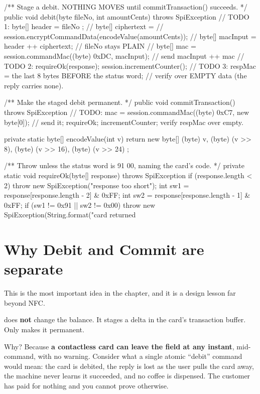 \begin{jcode}
    /** Stage a debit. NOTHING MOVES until commitTransaction() succeeds. */
    public void debit(byte fileNo, int amountCents) throws SpiException {
        // TODO 1: byte[] header     = { fileNo };
        //         byte[] ciphertext =
        //             session.encryptCommandData(encodeValue(amountCents));
        //         byte[] macInput   = header ++ ciphertext;  // fileNo stays PLAIN
        //         byte[] mac        = session.commandMac((byte) 0xDC, macInput);
        //         send macInput ++ mac
        // TODO 2: requireOk(response); session.incrementCounter();
        // TODO 3: respMac = the last 8 bytes BEFORE the status word;
        //         verify over EMPTY data (the reply carries none).
    }

    /** Make the staged debit permanent. */
    public void commitTransaction() throws SpiException {
        // TODO: mac = session.commandMac((byte) 0xC7, new byte[0]);
        //       send it; requireOk; incrementCounter; verify respMac over empty.
    }

    private static byte[] encodeValue(int v) {
        return new byte[]{ (byte) v, (byte) (v >> 8),
                           (byte) (v >> 16), (byte) (v >> 24) };
    }

    /** Throw unless the status word is 91 00, naming the card's code. */
    private static void requireOk(byte[] response) throws SpiException {
        if (response.length < 2) throw new SpiException("response too short");
        int sw1 = response[response.length - 2] & 0xFF;
        int sw2 = response[response.length - 1] & 0xFF;
        if (sw1 != 0x91 || sw2 != 0x00) {
            throw new SpiException(String.format("card returned %
        }
    }
\end{jcode}

\section{Why Debit and Commit are separate}

This is the most important idea in the chapter, and it is a design lesson far
beyond NFC.

 does \textbf{not} change the balance. It stages a delta in the
card's transaction buffer. Only  makes it permanent.

Why? Because \textbf{a contactless card can leave the field at any instant},
mid-command, with no warning. Consider what a single atomic ``debit'' command
would mean: the card is debited, the reply is lost as the user pulls the card
away, the machine never learns it succeeded, and no coffee is dispensed. The
customer has paid for nothing and you cannot prove otherwise.

